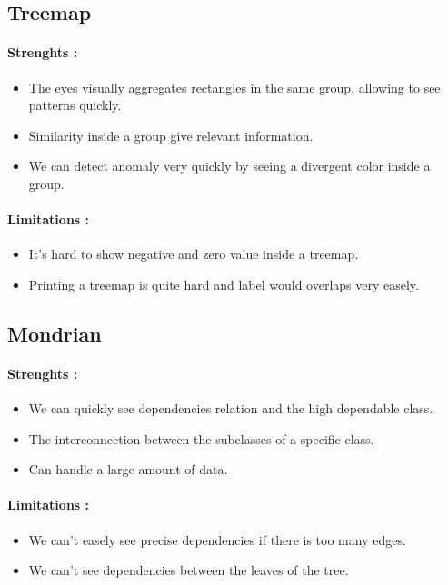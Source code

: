 \documentclass[a4paper,11pt]{report}
\begin{document}
\subsection*{Treemap}

\paragraph{Strenghts : }

\begin{itemize}
\item The eyes visually aggregates rectangles in the same group, allowing to see patterns quickly.
\item Similarity inside a group give relevant information.
\item We can detect anomaly very quickly by seeing a divergent color inside a group.
\end{itemize}

\paragraph{Limitations : }

\begin{itemize}
\item It's hard to show negative and zero value inside a treemap.
\item Printing a treemap is quite hard and label would overlaps very easely.
\end{itemize}

\subsection*{Mondrian}

\paragraph{Strenghts : }

\begin{itemize}
\item We can quickly see dependencies relation and the high dependable class.
\item The interconnection between the subclasses of a specific class.
\item Can handle a large amount of data.
\end{itemize}

\paragraph{Limitations : }

\begin{itemize}
\item We can't easely see precise dependencies if there is too many edges.
\item We can't see dependencies between the leaves of the tree.
\end{itemize}
\end{document}
